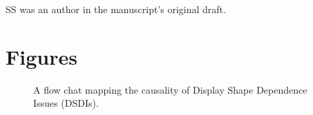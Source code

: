 \documentclass{bmcart}
\begin{document}
\begin{backmatter}
SS was an author in the manuscript's original draft.





\pagebreak
\section*{Figures}

 \begin{figure}[h!]
 \centering
   \caption{
   A flow chat mapping the causality of Display Shape Dependence Issues (DSDIs).}
   \label{fig:dsdiFlow}
\end{figure}


\end{backmatter}
\end{document}
